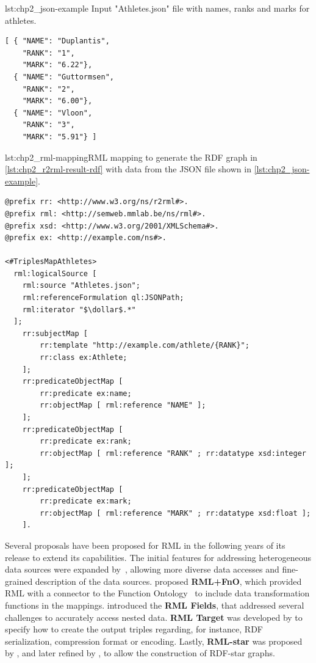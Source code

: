 \begin{minipage}{\textwidth}
\begin{captionedlisting}{lst:chp2_json-example}
{Input "Athletes.json" file with names, ranks and marks for athletes.}
\centering
\begin{multicols}{2}
{\begin{lstlisting}[]
[ { "NAME": "Duplantis",
    "RANK": "1",
    "MARK": "6.22"},
  { "NAME": "Guttormsen",
    "RANK": "2",  
    "MARK": "6.00"},
  { "NAME": "Vloon",
    "RANK": "3",
    "MARK": "5.91"} ]
\end{lstlisting}}
\end{multicols}
\end{captionedlisting}
\end{minipage}


\begin{captionedlisting}{lst:chp2_rml-mapping}{RML mapping to generate the RDF graph in \cref{lst:chp2_r2rml-result-rdf} with data from the JSON file shown in \cref{lst:chp2_json-example}.}
\centering
{\begin{lstlisting}[language=r2rml]
@prefix rr: <http://www.w3.org/ns/r2rml#>.
@prefix rml: <http://semweb.mmlab.be/ns/rml#>.
@prefix xsd: <http://www.w3.org/2001/XMLSchema#>.
@prefix ex: <http://example.com/ns#>.

<#TriplesMapAthletes>
  rml:logicalSource [
    rml:source "Athletes.json";
    rml:referenceFormulation ql:JSONPath;
    rml:iterator "$\dollar$.*"
  ];
    rr:subjectMap [
        rr:template "http://example.com/athlete/{RANK}";
        rr:class ex:Athlete;
    ];
    rr:predicateObjectMap [
        rr:predicate ex:name;
        rr:objectMap [ rml:reference "NAME" ];
    ];
    rr:predicateObjectMap [
        rr:predicate ex:rank;
        rr:objectMap [ rml:reference "RANK" ; rr:datatype xsd:integer ];
    ];
    rr:predicateObjectMap [
        rr:predicate ex:mark;
        rr:objectMap [ rml:reference "MARK" ; rr:datatype xsd:float ];
    ].
\end{lstlisting}}
\end{captionedlisting}

Several proposals have been proposed for RML in the following years of its release to extend its capabilities. The initial features for addressing heterogeneous data sources were expanded by~\cite{Dimou2015Machine}, allowing more diverse data accesses and fine-grained description of the data sources. \cite{DeMeester2017fno_dbpedia} proposed \textbf{RML+FnO}, which provided RML with a connector to the Function Ontology~\parencite{demeester2016fno} to include data transformation functions in the mappings. \cite{delva2021rml-fields} introduced the \textbf{RML Fields}, that addressed several challenges to accurately access nested data. \textbf{RML Target} was developed by \cite{VanAssche2021LeveragingWebThings} to specify how to create the output triples regarding, for instance, RDF serialization, compression format or encoding. Lastly, \textbf{RML-star} was proposed by \cite{delva2021rml-star}, and later refined by \cite{arenas2023morphstar}, to allow the construction of RDF-star graphs. 

